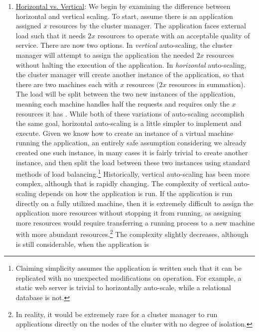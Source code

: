 \begin{enumerate}
  \item \underline{Horizontal vs. Vertical}: We begin by examining
    the difference between horizontal and vertical scaling.
    To start, assume there is an application assigned $x$ resources by the
    cluster manager. The application
    faces external load such that it needs $2x$ resources to operate with an
    acceptable quality of service. There are now two options. In
    \textit{vertical} auto-scaling, the cluster manager will attempt to assign
    the application the needed $2x$ resources
    without halting the execution of the application. In \textit{horizontal}
    auto-scaling, the cluster manager will create another instance of
    the application, so that there are two machines each with
    $x$ resources ($2x$ resources in summation). The load will be split between
    the two new instances of the application, meaning each machine handles half
    the requests and requires only the $x$ resources it has
    \cite{auto-scaling-techniques-for-elastic-applications-in-cloud-environments}. While
    both of these variations of auto-scaling accomplish the same goal, horizontal
    auto-scaling is a little simpler to implement and execute.
    Given we know how to create an instance of a
    virtual machine running the application, an entirely safe assumption
    considering we already created one such instance, in many cases it is
    fairly trivial to create
    another instance, and then split the load between these two instances using
    standard methods of load balancing.\footnote{Claiming
    simplicity assumes the application is written
    such that it can be replicated with no unexpected modifications
    on operation. For example, a static web server is trivial to horizontally
    auto-scale, while a relational database is not.}
    Historically, vertical auto-scaling has been more complex,
    although that is rapidly changing.
    The complexity of vertical auto-scaling depends on how the application
    is run. If the application is run directly on a fully utilized machine,
    then it is extremely difficult to assign the application more resources
    without stopping it from running, as assigning more resources
    would require transferring a running
    process to a new machine with more abundant resources.\footnote{In reality,
    it would be extremely rare for a cluster manager to run applications
    directly on the nodes of the cluster with no degree of isolation.} The complexity
    slightly decreases, although is still considerable, when the application is

\end{enumerate}
